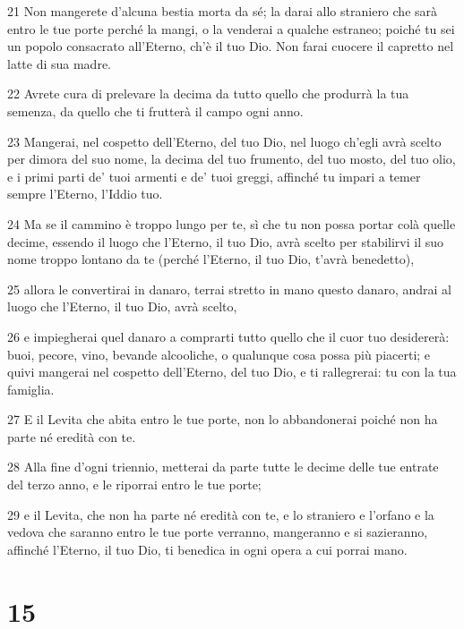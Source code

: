 \par 21 Non mangerete d'alcuna bestia morta da sé; la darai allo straniero che sarà entro le tue porte perché la mangi, o la venderai a qualche estraneo; poiché tu sei un popolo consacrato all'Eterno, ch'è il tuo Dio. Non farai cuocere il capretto nel latte di sua madre.
\par 22 Avrete cura di prelevare la decima da tutto quello che produrrà la tua semenza, da quello che ti frutterà il campo ogni anno.
\par 23 Mangerai, nel cospetto dell'Eterno, del tuo Dio, nel luogo ch'egli avrà scelto per dimora del suo nome, la decima del tuo frumento, del tuo mosto, del tuo olio, e i primi parti de' tuoi armenti e de' tuoi greggi, affinché tu impari a temer sempre l'Eterno, l'Iddio tuo.
\par 24 Ma se il cammino è troppo lungo per te, sì che tu non possa portar colà quelle decime, essendo il luogo che l'Eterno, il tuo Dio, avrà scelto per stabilirvi il suo nome troppo lontano da te (perché l'Eterno, il tuo Dio, t'avrà benedetto),
\par 25 allora le convertirai in danaro, terrai stretto in mano questo danaro, andrai al luogo che l'Eterno, il tuo Dio, avrà scelto,
\par 26 e impiegherai quel danaro a comprarti tutto quello che il cuor tuo desidererà: buoi, pecore, vino, bevande alcooliche, o qualunque cosa possa più piacerti; e quivi mangerai nel cospetto dell'Eterno, del tuo Dio, e ti rallegrerai: tu con la tua famiglia.
\par 27 E il Levita che abita entro le tue porte, non lo abbandonerai poiché non ha parte né eredità con te.
\par 28 Alla fine d'ogni triennio, metterai da parte tutte le decime delle tue entrate del terzo anno, e le riporrai entro le tue porte;
\par 29 e il Levita, che non ha parte né eredità con te, e lo straniero e l'orfano e la vedova che saranno entro le tue porte verranno, mangeranno e si sazieranno, affinché l'Eterno, il tuo Dio, ti benedica in ogni opera a cui porrai mano.

\chapter{15}


